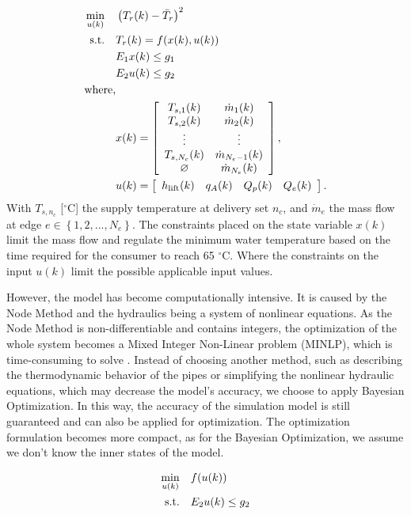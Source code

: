 \begin{align}
\min_{u(k)} \quad & \left(T_r(k) - \bar{T}_r\right)^2 \notag \\
\text{s.t.} \quad  & T_r(k) = f(x(k), u(k)) \notag\\
& E_1 x(k)  \leq g_1 \notag \\ 
& E_2 u(k) \leq g_2 \notag\\
\text{where,} & \\\
& x(k) = 
\left[\begin{array}{cc}
T_{s,1}(k) & \dot{m}_1(k)  \\
T_{s,2}(k) & \dot{m}_2(k) \\
 \vdots  & \vdots \\
T_{s,N_c}(k) & \dot{m}_{N_e - 1}(k) \\
\varnothing & \dot{m}_{N_e}(k)  
\end{array}\right], \notag\\
&u(k) =  \left[\begin{array}{cccc}
h_{\text{lift}}(k) & q_A(k) & Q_p(k) & Q_e(k) 
\end{array}\right]. \notag 
\end{align}
With $T_{s,n_c}$ [$^{\circ}\text{C}$] the supply temperature at delivery set $n_c$, and $\dot{m}_{e}$ the mass flow at edge $e \in \left\{1,2,...,N_e \right\}$. The constraints placed on the state variable $x(k)$ limit the mass flow and regulate the minimum water temperature based on the time required for the consumer to reach 65 $^{\circ}\text{C}$. Where the constraints on the input $u(k)$ limit the possible applicable input values. 

However, the model has become computationally intensive. It is caused by the Node Method and the hydraulics being a system of nonlinear equations. As the Node Method is non-differentiable and contains integers, the optimization of the whole system becomes a Mixed Integer Non-Linear problem (MINLP), which is time-consuming to solve \cite{MAURER2021244}. Instead of choosing another method, such as describing the thermodynamic behavior of the pipes or simplifying the nonlinear hydraulic equations, which may decrease the model's accuracy, we choose to apply Bayesian Optimization. In this way, the accuracy of the simulation model is still guaranteed and can also be applied for optimization. The optimization formulation becomes more compact, as for the Bayesian Optimization, we assume we don't know the inner states of the model. 

\begin{align}
\min_{u(k)} & \quad f(u(k)) \\
\text{s.t.} & \quad E_2 u(k)  \leq g_2 \notag 
\end{align}

